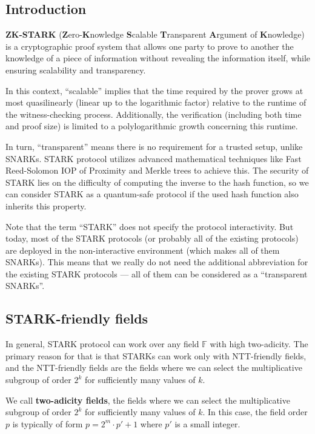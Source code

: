 \documentclass[../lecture-notes.tex]{subfiles}
\begin{document}
\subsection{Introduction}

\textbf{ZK-STARK} (\textbf{Z}ero-\textbf{K}nowledge \textbf{S}calable
\textbf{T}ransparent \textbf{A}rgument of \textbf{K}nowledge) is a cryptographic
proof system that allows one party to prove to another the knowledge of a piece
of information without revealing the information itself, while ensuring
scalability and transparency. 

In this context, ``scalable'' implies that the time required by the prover grows
at most quasilinearly (linear up to the logarithmic factor) relative to the
runtime of the witness-checking process. Additionally, the verification
(including both time and proof size) is limited to a polylogarithmic growth
concerning this runtime.

In turn, ``transparent'' means there is no requirement for a trusted setup,
unlike SNARKs. STARK protocol utilizes advanced mathematical techniques like
Fast Reed-Solomon IOP of Proximity and Merkle trees to achieve this. The
security of STARK lies on the difficulty of computing the inverse to
the hash function, so we can consider STARK as a quantum-safe protocol if the
used hash function also inherits this property.

Note that the term ``STARK'' does not specify the protocol interactivity. But
today, most of the STARK protocols (or probably all of the existing protocols)
are deployed in the non-interactive environment (which makes all of them
SNARKs). This means that we really do not need the additional abbreviation for
the existing STARK protocols --- all of them can be considered as a ``transparent
SNARKs''.

\subsection{STARK-friendly fields}
In general, STARK protocol can work over any field $\mathbb{F}$ with high two-adicity. The primary 
reason for that is that STARKs can work only with NTT-friendly fields, and the
NTT-friendly fields are the fields where we can select the multiplicative
subgroup of order $2^k$ for sufficiently many values of $k$. 

\begin{definition}
    We call \textbf{two-adicity fields}, the fields where we can select the
    multiplicative subgroup of order $2^k$ for sufficiently many values of $k$.
    In this case, the field order $p$ is typically of form $p = 2^m \cdot p' +
    1$ where $p'$ is a small integer.
\end{definition}
\end{document}
